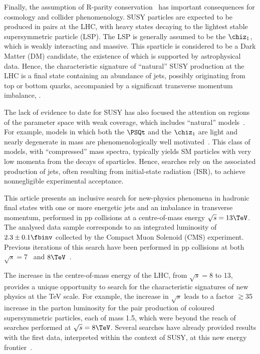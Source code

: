 Finally, the assumption of R-parity conservation~\cite{Farrar:1978xj}
has important consequences for cosmology and collider
phenomenology. SUSY particles are expected to be produced in pairs at
the LHC, with heavy states decaying to the lightest stable
supersymmetric particle (LSP). The LSP is generally assumed to be the
$\chiz_1$, which is weakly interacting and massive. This sparticle is
considered to be a Dark Matter (DM) candidate, the existence of which
is supported by astrophysical data. %
Hence, the characteristic signature of ``natural'' SUSY production at
the LHC is a final state containing an abundance of jets, possibly
originating from top or bottom quarks, accompanied by a significant
transverse momentum imbalance, \ptvecmiss.

The lack of evidence to date for SUSY has also focused the attention
on regions of the parameter space with weak coverage, which includes
``natural'' models~\cite{Delgado:2012eu, Boehm:1999tr, Carena:2008mj,
  Grober:2014aha, Grober:2015fia}. For example, models in which both
the $\PSQt$ and the $\chiz_1$ are light and nearly degenerate in mass
are phenomenologically well motivated~\cite{Boehm:1999bj,
  Balazs:2004bu, Martin:2007gf, Martin:2007hn}. This class of models,
with ``compressed'' mass spectra, typically yields SM particles with
very low momenta from the decays of sparticles. Hence, searches rely
on the associated production of jets, often resulting from
initial-state radiation (ISR), to achieve nonnegligible experimental
acceptance.

This article presents an inclusive search for new-physics phenomena in
hadronic final states with one or more energetic jets and an imbalance
in transverse momentum, performed in pp collisions at a centre-of-mass
energy $\sqrt{s} = 13\TeV$. The analysed data sample corresponds to an
integrated luminosity of $2.3 \pm 0.1 \fbinv$ %
collected by the Compact Muon Solenoid (CMS) experiment. Previous
iterations of this search have been performed in pp collisions at both
$\sqrt{s} = 7$~\cite{RA1Paper, RA1Paper2011, RA1Paper2011FULL} and
$8\TeV$~\cite{RA1Paper2012, RA1Parked}.

The increase in the centre-of-mass energy of the LHC, from $\sqrt{s} =
8$ to 13\TeV, provides a unique opportunity to search for the
characteristic signatures of new physics at the TeV scale. For
example, the increase in $\sqrt{s}$ leads to a factor $\gtrsim$35
increase in the parton luminosity for the pair production of coloured
supersymmetric particles, each of mass 1.5\TeV, which were beyond the
reach of searches performed at $\sqrt{s} = 8\TeV$. Several searches
have already provided results with the first data, interpreted within
the context of SUSY, at this new energy frontier~\cite{atlas-12,
  atlas-13, cms-12, cms-13}.

